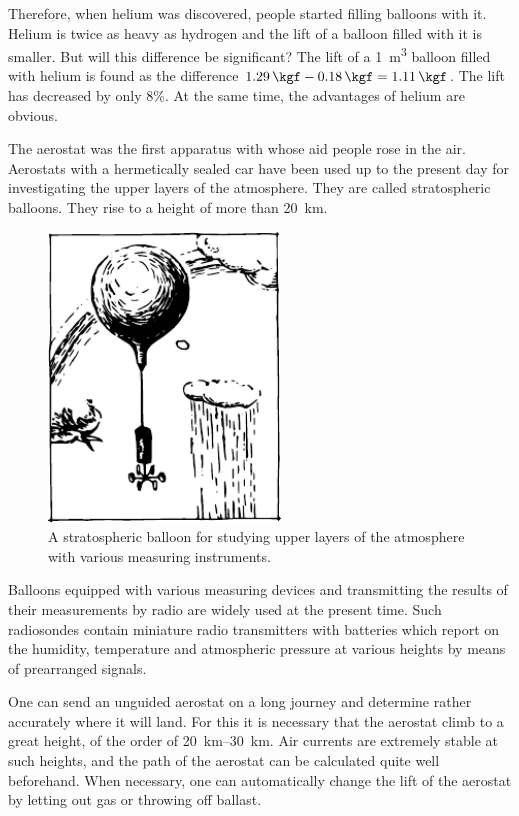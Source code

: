 Therefore, when helium was discovered, people started filling balloons with it. Helium is twice as heavy as hydrogen and the lift of a balloon filled with it is smaller. But will this difference be significant? The lift of a \SI{1}{\meter\cubed} balloon filled with helium is found as the difference $\SI{1.29}{\kgf} - \SI{0.18}{\kgf} = \SI{1.11}{\kgf}$.
The lift has decreased by only 8\%. At the same time, the advantages of helium are obvious.

The aerostat was the first apparatus with whose aid people rose in the air. Aerostats with a hermetically sealed car have been used up to the present day for investigating the upper layers of the atmosphere. They are called stratospheric balloons. They rise to a height of more than \SI{20}{\kilo\meter}.
\begin{figure}[!ht]
\centering
\includegraphics[width=0.55\textwidth]{figures/fig-7-8.pdf}
\caption{A stratospheric balloon for studying upper layers of the atmosphere with various measuring instruments.}
\label{fig-7-08}
\end{figure}
Balloons equipped with various measuring devices and transmitting the results of their measurements by radio  are widely used at the present time. Such radiosondes contain miniature radio transmitters with batteries which report on the humidity, temperature and atmospheric pressure at various heights by means of prearranged signals.

One can send an unguided aerostat on a long journey and determine rather accurately where it will land. For this it is necessary that the aerostat climb to a great height, of the order of \SIrange{20}{30}{\kilo\meter}. Air currents are extremely stable at such heights, and the path of the aerostat can be calculated quite well beforehand. When necessary, one can automatically change the lift of the aerostat by letting out gas or throwing off ballast. 

